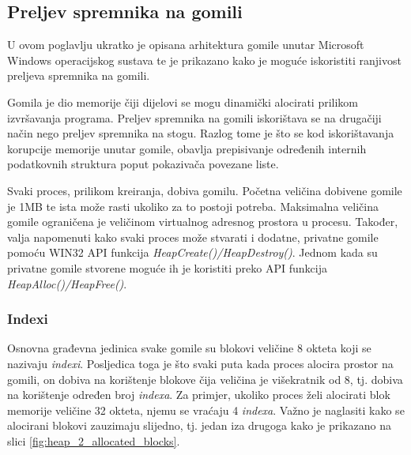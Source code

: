 \documentclass[times, utf8, diplomski, numeric]{fer}
\begin{document}
\subsection{Preljev spremnika na gomili}
\label{scr:heap_overflow}

U ovom poglavlju ukratko je opisana arhitektura gomile unutar
Microsoft Windows operacijskog sustava te je prikazano kako je
moguće iskoristiti ranjivost preljeva spremnika na gomili.

Gomila je dio memorije čiji dijelovi se mogu dinamički alocirati
prilikom izvršavanja programa. Preljev spremnika na gomili
iskorištava se na drugačiji način nego preljev spremnika na
stogu. Razlog tome je što se kod iskorištavanja korupcije
memorije unutar gomile, obavlja prepisivanje određenih internih
podatkovnih struktura poput pokazivača povezane liste.

Svaki proces, prilikom kreiranja, dobiva gomilu. Početna veličina
dobivene gomile je 1MB te ista može rasti ukoliko za to postoji
potreba. Maksimalna veličina gomile ograničena je veličinom				%
virtualnog adresnog prostora u procesu. Također, valja napomenuti kako svaki proces
može stvarati i dodatne, privatne gomile pomoću WIN32 API
funkcija \emph{HeapCreate()/HeapDestroy()}. Jednom kada su
privatne gomile stvorene moguće ih je koristiti preko API
funkcija \emph{HeapAlloc()/HeapFree()}.

\subsubsection{Indexi}
Osnovna građevna jedinica svake gomile su blokovi veličine 8
okteta koji se nazivaju \emph{indexi}. Posljedica toga je što
svaki puta kada proces alocira prostor na gomili, on dobiva na
korištenje blokove čija veličina je višekratnik od 8, tj. dobiva
na korištenje određen broj \emph{indexa}. Za primjer, ukoliko
proces želi alocirati blok memorije veličine 32 okteta, njemu se
vraćaju 4 \emph{indexa}. Važno je naglasiti kako se alocirani			%
blokovi zauzimaju slijedno, tj. jedan iza drugoga kako je
prikazano na slici \ref{fig:heap_2_allocated_blocks}.
\end{document}
